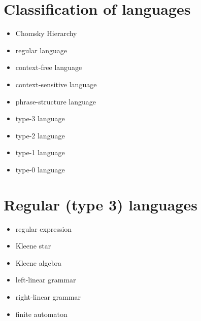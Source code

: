 \documentclass[12pt]{article}
\begin{document}
\section{Classification of languages}
\begin{itemize}
\item Chomsky Hierarchy
\item regular language
\item context-free language
\item context-sensitive language
\item phrase-structure language
\item type-3 language
\item type-2 language
\item type-1 language
\item type-0 language
\end{itemize}

\section{Regular (type 3) languages}
\begin{itemize}
\item regular expression
\item Kleene star
\item Kleene algebra
\item left-linear grammar
\item right-linear grammar
\item finite automaton
\end{itemize}
\end{document}
